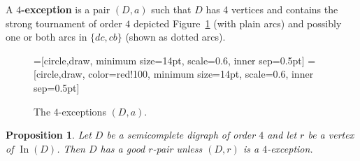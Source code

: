 \documentclass{article}
\newtheorem{proposition}[theorem]{Proposition}
\theoremstyle{definition}
\DeclareMathOperator{\In}{In}
\newcommand{\2}{\vspace{0.2cm}}
\begin{document}
A {\bf $4$-exception} is a pair $(D,a)$ such that $D$ has 4 vertices
and contains the strong tournament of order $4$ depicted
Figure~\ref{fig:ST4} (with plain arcs) and possibly one or both arcs
in $\{dc, cb\}$ (shown as dotted arcs).
\begin{figure}[H]
\begin{center}
=[circle,draw, minimum size=14pt, scale=0.6, inner sep=0.5pt]
=[circle,draw, color=red!100, minimum size=14pt, scale=0.6, inner sep=0.5pt]

\caption{The $4$-exceptions $(D,a)$.}\label{fig:ST4}
\end{center}
\end{figure}

\begin{proposition}
Let $D$ be a semicomplete digraph of order $4$ and let $r$ be a vertex
of $\In(D)$.  Then $D$ has a good $r$-pair unless $(D,r)$ is a
$4$-exception.
\end{proposition}
\end{document}
